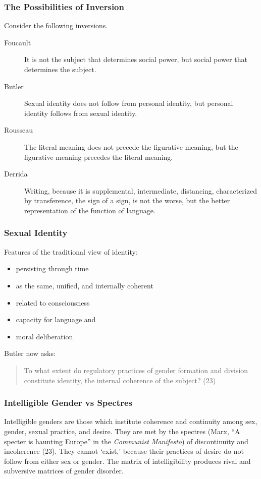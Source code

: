 \documentclass[xcolor=dvipsnames]{beamer}
\begin{document}
\begin{frame}
  \frametitle{The Possibilities of Inversion}
  Consider the following inversions.
  \begin{description}
  \item[Foucault] It is not the subject that determines social power,
    but social power that determines the subject.
  \item[Butler] Sexual identity does not follow from personal
    identity, but personal identity follows from sexual identity.
  \item[Rousseau] The literal meaning does not precede the figurative
    meaning, but the figurative meaning precedes the literal meaning.
  \item[Derrida] Writing, because it is supplemental, intermediate,
    distancing, characterized by transference, the sign of a sign, is
    not the worse, but the better representation of the function of
    language.
  \end{description}
\end{frame}

\begin{frame}
  \frametitle{Sexual Identity}
  Features of the traditional view of identity:
  \begin{itemize}
  \item persisting through time
  \item as the same, unified, and internally coherent
  \item related to consciousness
  \item capacity for language and
  \item moral deliberation
  \end{itemize}
Butler now asks:
\begin{quote}
  To what extent do regulatory practices of gender formation and
  division constitute identity, the internal coherence of the subject?
  (23)
\end{quote}
\end{frame}

\begin{frame}
  \frametitle{Intelligible Gender vs Spectres}
  Intelligible genders are those which institute coherence and
  continuity among sex, gender, sexual practice, and desire. They are
  met by the spectres (Marx, ``A specter is haunting Europe'' in the
  \emph{Communist Manifesto}) of discontinuity and incoherence (23).
  They cannot `exist,' because their practices of desire do not follow
  from either sex or gender. The matrix of intelligibility produces
  rival and subversive matrices of gender disorder.
\end{frame}
\end{document}
